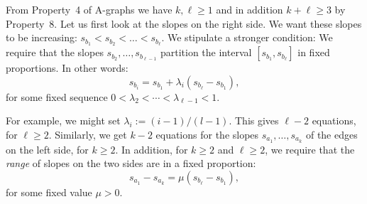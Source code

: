 From Property~4 of A-graphs we have $k,\ell\ge1$ and in addition
 $k+\ell\ge 3$ by Property~8.
Let us first look at the slopes on the right side.
We want these slopes to be increasing:
$s_{b_1} < s_{b_2} < \dots  <s_{b_\ell}$. We stipulate a stronger
condition:
We require that the slopes
$s_{b_2}, \dots, s_{b_{\ell-1}}$ partition the interval
$[s_{b_1},s_{b_\ell}]$ in fixed proportions. In other words:
\begin{equation}
\label{eq:proportion}
s_{b_i} = s_{b_1} + \lambda_i(s_{b_{\ell}}-s_{b_1}),
\end{equation}
for some fixed sequence $0<\lambda_2<\cdots<\lambda_{\ell-1}<1$.

For example, we might set $\lambda_i := (i-1)/(l-1)$.
This gives $\ell-2$ equations, for $\ell\ge 2$. Similarly, we get
$k-2$ equations for the slopes
$s_{a_1}, \dots, s_{a_{k}}$ of the edges on the left side, for $k\ge 2$.
In addition, for $k\ge 2$ and $\ell\ge 2$, we require that the \emph{range} of
slopes
on the two sides are in a fixed proportion:
\begin{equation}
\label{eq:proportion2}
s_{a_1}-s_{a_{k}} = \mu (s_{b_{\ell}}-s_{b_1}),
\end{equation}
for some fixed value $\mu>0$.

